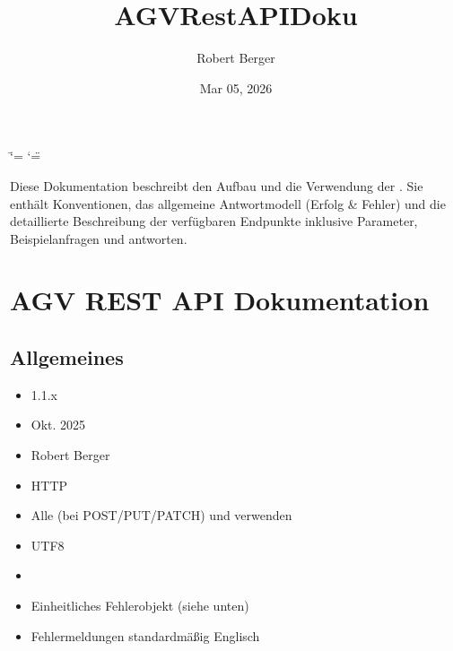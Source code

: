 \documentclass[letterpaper,10pt,english]{sphinxmanual}
\title{AGV\sphinxhyphen{}RestAPI\sphinxhyphen{}Doku}
\date{Mar 05, 2026}
\author{Robert Berger}
\begin{document}
\ifdefined\shorthandoff
  \ifnum\catcode`\=\string=\active\shorthandoff{=}\fi
  \ifnum\catcode`\"=\active{}\fi
\fi

\pagestyle{empty}
\sphinxmaketitle
\pagestyle{plain}
\sphinxtableofcontents
\pagestyle{normal}
\label{\detokenize{index::doc}}


\sphinxAtStartPar
Diese Dokumentation beschreibt den Aufbau und die Verwendung der .
Sie enthält Konventionen, das allgemeine Antwortmodell (Erfolg \& Fehler) und die
detaillierte Beschreibung der verfügbaren Endpunkte \textendash{} inklusive Parameter,
Beispielanfragen und \sphinxhyphen{}antworten.

\sphinxstepscope


\chapter{AGV \textendash{} REST API Dokumentation}
\label{\detokenize{agv_overview:agv-rest-api-dokumentation}}\label{\detokenize{agv_overview::doc}}

\section{Allgemeines}
\label{\detokenize{agv_overview:allgemeines}}\begin{itemize}
\item {} 
\sphinxAtStartPar
{} 1.1.x

\item {} 
\sphinxAtStartPar
{} Okt. 2025

\item {} 
\sphinxAtStartPar
{} Robert Berger

\item {} 
\sphinxAtStartPar
{} HTTP

\item {} 
\sphinxAtStartPar
{} Alle  (bei POST/PUT/PATCH) und  verwenden 

\item {} 
\sphinxAtStartPar
{} UTF\sphinxhyphen{}8

\item {} 
\sphinxAtStartPar
{} 

\item {} 
\sphinxAtStartPar
{} Einheitliches Fehlerobjekt (siehe unten)

\item {} 
\sphinxAtStartPar
{} Fehlermeldungen standardmäßig Englisch

\end{itemize}
\end{document}
